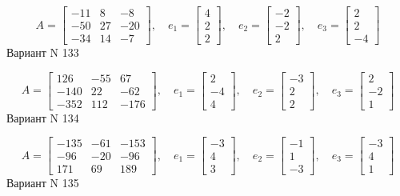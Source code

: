 \documentclass[11pt]{report}
\begin{document}
$$A = \left[\begin{matrix}-11 & 8 & -8\\-50 & 27 & -20\\-34 & 14 & -7\end{matrix}\right],\quad e_1 = \left[\begin{matrix}4\\2\\2\end{matrix}\right],\quad e_2 = \left[\begin{matrix}-2\\-2\\2\end{matrix}\right],\quad e_3 = \left[\begin{matrix}2\\2\\-4\end{matrix}\right]$$Вариант N 133

$$A = \left[\begin{matrix}126 & -55 & 67\\-140 & 22 & -62\\-352 & 112 & -176\end{matrix}\right],\quad e_1 = \left[\begin{matrix}2\\-4\\4\end{matrix}\right],\quad e_2 = \left[\begin{matrix}-3\\2\\2\end{matrix}\right],\quad e_3 = \left[\begin{matrix}2\\-2\\1\end{matrix}\right]$$Вариант N 134

$$A = \left[\begin{matrix}-135 & -61 & -153\\-96 & -20 & -96\\171 & 69 & 189\end{matrix}\right],\quad e_1 = \left[\begin{matrix}-3\\4\\3\end{matrix}\right],\quad e_2 = \left[\begin{matrix}-1\\1\\-3\end{matrix}\right],\quad e_3 = \left[\begin{matrix}-3\\4\\1\end{matrix}\right]$$Вариант N 135
\end{document}
